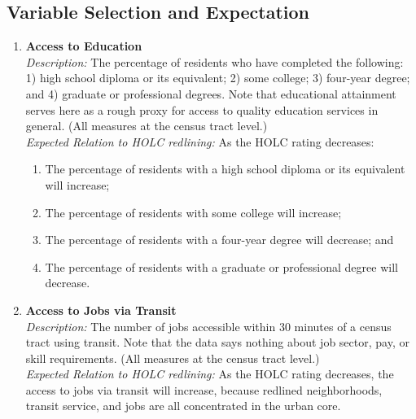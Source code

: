 \documentclass[paper=letter, fontsize=12pt]{scrartcl} %
\begin{document}
\subsection{Variable Selection and Expectation}
\begin{enumerate}
	\item \textbf{Access to Education}\\
	\textit{Description:} The percentage of residents who have completed the following: 1) high school diploma or its equivalent; 2) some college; 3) four-year degree; and 4) graduate or professional degrees. Note that educational attainment serves here as a rough proxy for access to quality education services in general. (All measures at the census tract level.)\\
	\textit{Expected Relation to HOLC redlining:} As the HOLC rating decreases:
	\begin{enumerate}
		\item The percentage of residents with a high school diploma or its equivalent will increase;
		\item The percentage of residents with some college will increase;
		\item The percentage of residents with a four-year degree will decrease; and
		\item The percentage of residents with a graduate or professional degree will decrease.
	\end{enumerate}
	
	\item \textbf{Access to Jobs via Transit}\\
	\textit{Description:} The number of jobs accessible within 30 minutes of a census tract using transit. Note that the data says nothing about job sector, pay, or skill requirements. (All measures at the census tract level.)\\
	\textit{Expected Relation to HOLC redlining:} As the HOLC rating decreases, the access to jobs via transit will increase, because redlined neighborhoods, transit service, and jobs are all concentrated in the urban core.
	

\end{enumerate}
\end{document}
